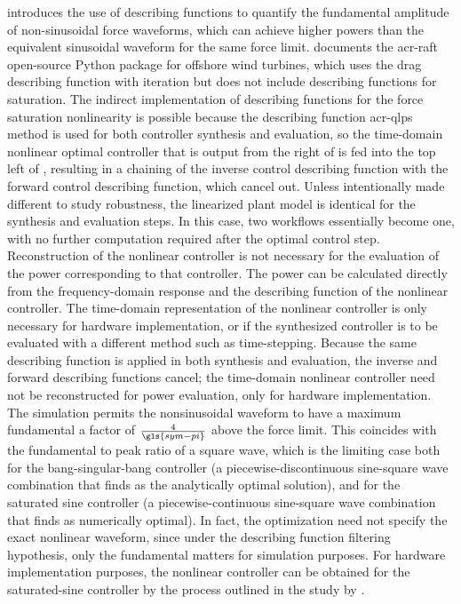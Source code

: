 
 introduces the use of describing functions to quantify the fundamental amplitude of non-sinusoidal force waveforms, which can achieve higher powers than the equivalent sinusoidal waveform for the same force limit.
\citet{hall_open-source_2022} documents the \gls{acr-raft} open-source Python package for offshore wind turbines, which uses the drag describing function with iteration but does not include describing functions for saturation.
\ifdefined\DISSERTATION
    The indirect implementation of describing functions for the force saturation nonlinearity is possible because the describing function \gls{acr-qlps} method is used for both controller synthesis and evaluation, so the time-domain nonlinear optimal controller that is output from the right of  is fed into the top left of ,
    resulting in a chaining of the inverse control describing function with the forward control describing function, which cancel out.
    Unless intentionally made different to study robustness, the linearized plant model is identical for the synthesis and evaluation steps.
    In this case, two workflows essentially become one, with no further computation required after the optimal control step.
    Reconstruction of the nonlinear controller is not necessary for the evaluation of the power corresponding to that controller.
    The power can be calculated directly from the frequency-domain response and the describing function of the nonlinear controller.
    The time-domain representation of the nonlinear controller is only necessary for hardware implementation, or if the synthesized controller is to be evaluated with a different method such as time-stepping.
\else
    Because the same describing function is applied in both synthesis and evaluation, the inverse and forward describing functions cancel;
    the time-domain nonlinear controller need not be reconstructed for power evaluation, only for hardware implementation.
\fi
The simulation permits the nonsinusoidal waveform to have a maximum fundamental a factor of $\frac{4}{\gls{sym-pi}}$ above the force limit.
This coincides with the fundamental to peak ratio of a square wave, which is the limiting case both for the bang-singular-bang controller (a piecewise-discontinuous sine-square wave combination that \citet{hendrikx_optimal_2017} finds as the analytically optimal solution), and for the saturated sine controller (a piecewise-continuous sine-square wave combination that \citet{coe_initial_2020} finds as numerically optimal).
In fact, the optimization need not specify the exact nonlinear waveform, since under the describing function filtering hypothesis, only the fundamental matters for simulation purposes.
For hardware implementation purposes, the nonlinear controller can be obtained for the saturated-sine controller by the process outlined in the study by \citet{mccabe_force-limited_2024}.


